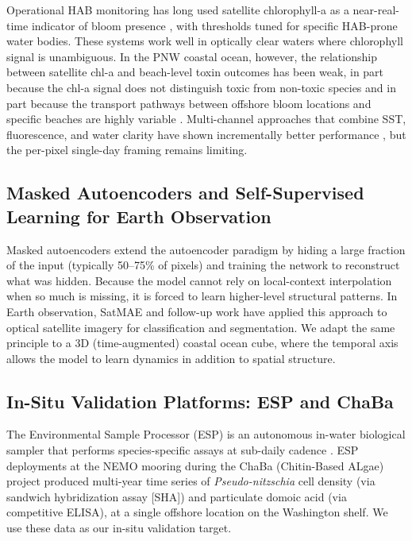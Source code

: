 \documentclass[toxins,article,submit,moreauthors]{Definitions/mdpi}
\begin{document}
Operational HAB monitoring has long used satellite chlorophyll-a as a near-real-time indicator of bloom presence \cite{Stumpf2003, Wynne2008}, with thresholds tuned for specific HAB-prone water bodies. These systems work well in optically clear waters where chlorophyll signal is unambiguous. In the PNW coastal ocean, however, the relationship between satellite chl-a and beach-level toxin outcomes has been weak, in part because the chl-a signal does not distinguish toxic from non-toxic species and in part because the transport pathways between offshore bloom locations and specific beaches are highly variable \cite{Trainer2002, Trainer2009}. Multi-channel approaches that combine SST, fluorescence, and water clarity have shown incrementally better performance \cite{Anderson2016, Hill2020}, but the per-pixel single-day framing remains limiting.

\subsection{Masked Autoencoders and Self-Supervised Learning for Earth Observation}

Masked autoencoders \cite{He2022MAE} extend the autoencoder paradigm by hiding a large fraction of the input (typically 50--75\% of pixels) and training the network to reconstruct what was hidden. Because the model cannot rely on local-context interpolation when so much is missing, it is forced to learn higher-level structural patterns. In Earth observation, SatMAE \cite{Cong2022SatMAE} and follow-up work \cite{Wang2023MAE} have applied this approach to optical satellite imagery for classification and segmentation. We adapt the same principle to a 3D (time-augmented) coastal ocean cube, where the temporal axis allows the model to learn dynamics in addition to spatial structure.

\subsection{In-Situ Validation Platforms: ESP and ChaBa}

The Environmental Sample Processor (ESP) is an autonomous in-water biological sampler that performs species-specific assays at sub-daily cadence \cite{Scholin2017}. ESP deployments at the NEMO mooring during the ChaBa (Chitin-Based ALgae) project \cite{Moore2021ESP} produced multi-year time series of \textit{Pseudo-nitzschia} cell density (via sandwich hybridization assay [SHA]) and particulate domoic acid (via competitive ELISA), at a single offshore location on the Washington shelf. We use these data as our in-situ validation target.
\end{document}
